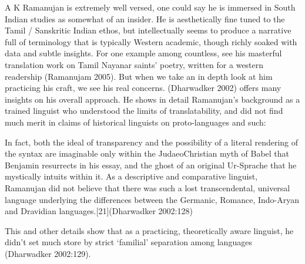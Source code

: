 A K Ramanujan is extremely well versed, one could say he is immersed in South Indian studies as somewhat of an insider. He is aesthetically fine tuned to the Tamil / Sanskritic Indian ethos, but intellectually seems to produce a narrative full of terminology that is typically Western academic, though richly soaked with data and subtle insights. For one example among countless, see his masterful translation work on Tamil Nayanar saints’ poetry, written for a western readership (Ramanujam 2005). But when we take an in depth look at him practicing his craft, we see his real concerns. (Dharwadker 2002) offers many insights on his overall approach. He shows in detail Ramanujan’s background as a trained linguist who understood the limits of translatability, and did not find much merit in claims of historical linguists on proto-languages and such:

\begin{myquote}
In fact, both the ideal of transparency and the possibility of a literal rendering of the syntax are imaginable only within the JudaeoChristian myth of Babel that Benjamin resurrects in his essay, and the ghost of an original Ur-Sprache that he mystically intuits within it. As a descriptive and comparative linguist, Ramanujan did not believe that there was such a lost transcendental, universal language underlying the differences between the Germanic, Romance, Indo-Aryan and Dravidian languages.[21]\hfill (Dharwadker 2002:128)
\end{myquote}

This and other details show that as a practicing, theoretically aware linguist, he didn’t set much store by strict ‘familial’ separation among languages (Dharwadker 2002:129).

